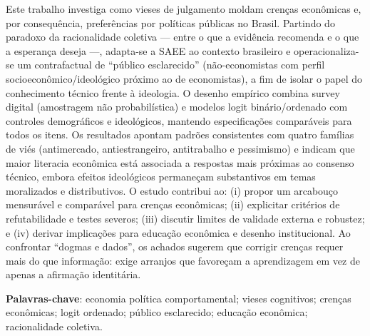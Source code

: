 
\setlength{\absparsep}{18pt} %
\begin{resumo}
    Este trabalho investiga como vieses de julgamento moldam crenças econômicas e, por consequência, preferências por políticas públicas no Brasil. Partindo do paradoxo da racionalidade coletiva — entre o que a evidência recomenda e o que a esperança deseja —, adapta-se a SAEE ao contexto brasileiro e operacionaliza-se um contrafactual de “público esclarecido” (não-economistas com perfil socioeconômico/ideológico próximo ao de economistas), a fim de isolar o papel do conhecimento técnico frente à ideologia. O desenho empírico combina survey digital (amostragem não probabilística) e modelos logit binário/ordenado com controles demográficos e ideológicos, mantendo especificações comparáveis para todos os itens. Os resultados apontam padrões consistentes com quatro famílias de viés (antimercado, antiestrangeiro, antitrabalho e pessimismo) e indicam que maior literacia econômica está associada a respostas mais próximas ao consenso técnico, embora efeitos ideológicos permaneçam substantivos em temas moralizados e distributivos. O estudo contribui ao: (i) propor um arcabouço mensurável e comparável para crenças econômicas; (ii) explicitar critérios de refutabilidade e testes severos; (iii) discutir limites de validade externa e robustez; e (iv) derivar implicações para educação econômica e desenho institucional. Ao confrontar “dogmas e dados”, os achados sugerem que corrigir crenças requer mais do que informação: exige arranjos que favoreçam a aprendizagem em vez de apenas a afirmação identitária.

 \textbf{Palavras-chave}: economia política comportamental; vieses cognitivos; crenças econômicas; logit ordenado; público esclarecido; educação econômica; racionalidade coletiva.
\end{resumo}

